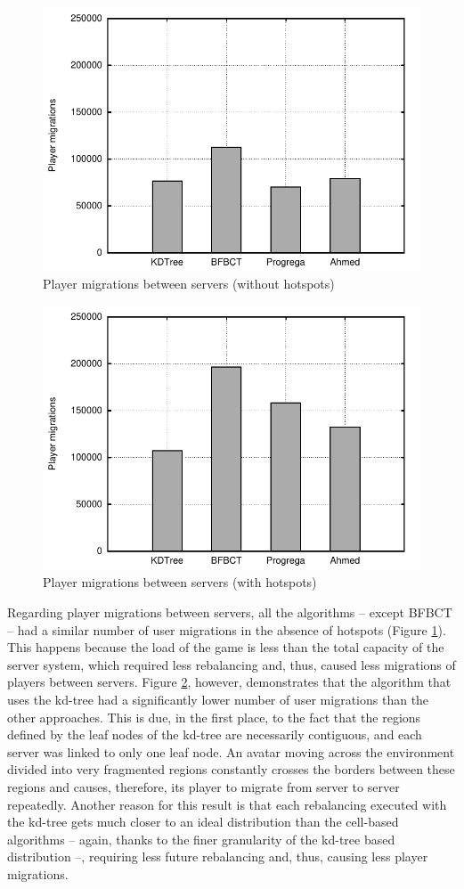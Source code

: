 \documentclass[acmjacm]{acmtrans2m}
\begin{document}
\begin{figure}[!t]
	\centering
	\includegraphics[width=0.8\linewidth]{images/migrations_uniform}
	\caption{Player migrations between servers (without hotspots)}
	\label{fig:migrations:uniform}
\end{figure}

\begin{figure}[!t]
	\centering
	\includegraphics[width=0.8\linewidth]{images/migrations_hotspots}
	\caption{Player migrations between servers (with hotspots)}
	\label{fig:migrations:hotspots}
\end{figure}

Regarding player migrations between servers, all the algorithms -- except BFBCT -- had a similar number of user migrations in the absence of hotspots (Figure \ref{fig:migrations:uniform}). This happens because the load of the game is less than the total capacity of the server system, which required less rebalancing and, thus, caused less migrations of players between servers. Figure \ref{fig:migrations:hotspots}, however, demonstrates that the algorithm that uses the kd-tree had a significantly lower number of user migrations than the other approaches. This is due, in the first place, to the fact that the regions defined by the leaf nodes of the kd-tree are necessarily contiguous, and each server was linked to only one leaf node. An avatar moving across the environment divided into very fragmented regions constantly crosses the borders between these regions and causes, therefore, its player to migrate from server to server repeatedly. Another reason for this result is that each rebalancing executed with the kd-tree gets much closer to an ideal distribution than the cell-based algorithms -- again, thanks to the finer granularity of the kd-tree based distribution --, requiring less future rebalancing and, thus, causing less player migrations.
\end{document}
